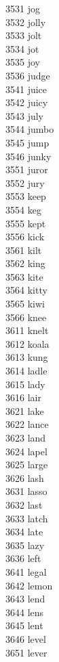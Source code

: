 3531 jog \\
3532 jolly \\
3533 jolt \\
3534 jot \\
3535 joy \\
3536 judge \\
3541 juice \\
3542 juicy \\
3543 july \\
3544 jumbo \\
3545 jump \\
3546 junky \\
3551 juror \\
3552 jury \\
3553 keep \\
3554 keg \\
3555 kept \\
3556 kick \\
3561 kilt \\
3562 king \\
3563 kite \\
3564 kitty \\
3565 kiwi \\
3566 knee \\
3611 knelt \\
3612 koala \\
3613 kung \\
3614 ladle \\
3615 lady \\
3616 lair \\
3621 lake \\
3622 lance \\
3623 land \\
3624 lapel \\
3625 large \\
3626 lash \\
3631 lasso \\
3632 last \\
3633 latch \\
3634 late \\
3635 lazy \\
3636 left \\
3641 legal \\
3642 lemon \\
3643 lend \\
3644 lens \\
3645 lent \\
3646 level \\
3651 lever \\
